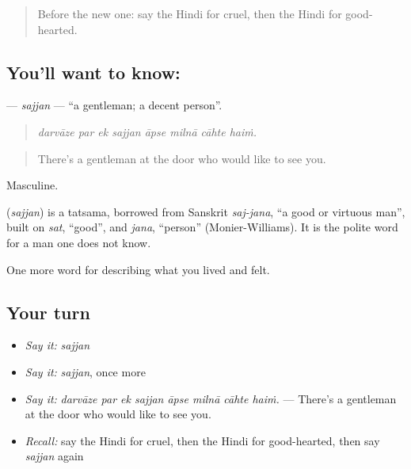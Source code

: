 \begin{quote}
Before the new one: say the Hindi for cruel, then the Hindi for good-hearted.
\end{quote}

\subsection*{You'll want to know: }
\textbf{} — \emph{sajjan} — \textquotedblleft{}a gentleman; a decent person\textquotedblright{}.

\begin{quote}
       
\end{quote}

\begin{quote}
\emph{darvāze par ek sajjan āpse milnā cāhte haiṁ.}
\end{quote}

\begin{quote}
There's a gentleman at the door who would like to see you.
\end{quote}

Masculine.

\begin{cousinweb}
\textbf{} (\emph{sajjan}) is a tatsama, borrowed from Sanskrit \emph{saj-jana}, \textquotedblleft{}a good or virtuous man\textquotedblright{}, built on \emph{sat}, \textquotedblleft{}good\textquotedblright{}, and \emph{jana}, \textquotedblleft{}person\textquotedblright{} (Monier-Williams). It is the polite word for a man one does not know.
\end{cousinweb}

\begin{grammarlens}[title={What you've built}]
One more word for describing what you lived and felt.
\end{grammarlens}

\subsection*{Your turn}
\begin{itemize}
\raggedright
  \item \emph{Say it:} \emph{sajjan}
  \item \emph{Say it:} \emph{sajjan}, once more
  \item \emph{Say it:} \emph{darvāze par ek sajjan āpse milnā cāhte haiṁ.} — There's a gentleman at the door who would like to see you.
  \item \emph{Recall:} say the Hindi for cruel, then the Hindi for good-hearted, then say \emph{sajjan} again
\end{itemize}

